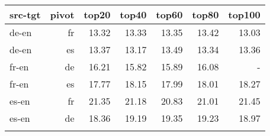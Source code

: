 \begin{tabular}{lrrrrrr}
\toprule

src-tgt & pivot & top20 & top40 & top60 & top80 & top100 \\
\toprule

de-en & fr & 13.32 & 13.33 & 13.35 & 13.42 & 13.03 \\
de-en & es & 13.37 & 13.17 & 13.49 & 13.34 & 13.36 \\
fr-en & de & 16.21 & 15.82 & 15.89 & 16.08 & - \\
fr-en & es & 17.77 & 18.15 & 17.99 & 18.01 & 18.27 \\
es-en & fr & 21.35 & 21.18 & 20.83 & 21.01 & 21.45\\
es-en & de & 18.36 & 19.19 & 19.35 & 19.23 & 18.97 \\
\bottomrule
\centering 
\small
\label{table:eparltopn}
\end{tabular}
